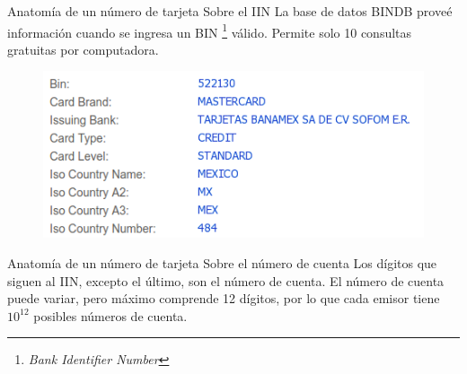 \begin{frame}{Anatomía de un número de tarjeta}
  {Sobre el IIN}
  La base de datos BINDB proveé información cuando se ingresa un BIN%
  \footnote{\textit{Bank Identifier Number}} válido.
  Permite solo 10 consultas gratuitas por computadora.
  \begin{figure}[H]
    \begin{center}
      \includegraphics[width=0.75\linewidth]{diagramas/bindb.png}
    \end{center}
  \end{figure}
\end{frame}

\begin{frame}{Anatomía de un número de tarjeta}
  {Sobre el número de cuenta}
  Los dígitos que siguen al IIN, excepto el último, son el número de cuenta.
  El número de cuenta puede variar, pero máximo comprende 12 dígitos, por lo que
  cada emisor tiene $10^{12}$ posibles números de cuenta.
\end{frame}

